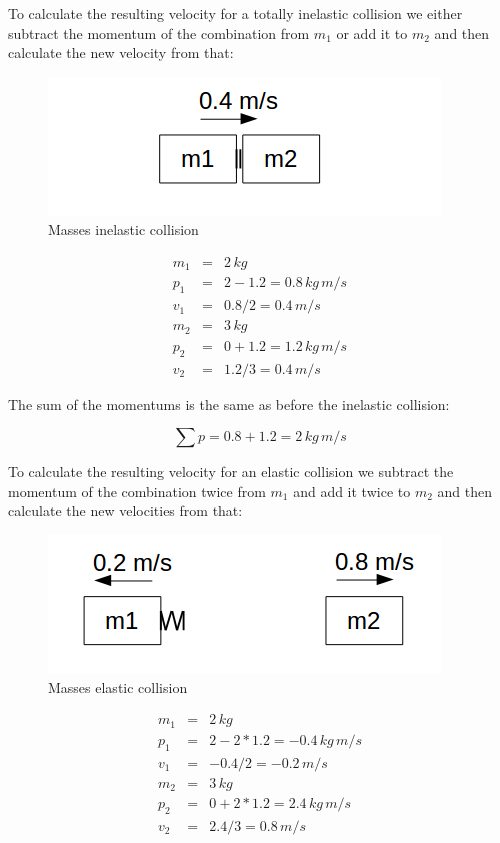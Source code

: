 \documentclass[]{../common/elementary-physics}
\begin{document}
To calculate the resulting velocity for a totally inelastic collision we either subtract the momentum of the combination from $m_1$ or add it to $m_2$ and then calculate the new velocity from that:

\begin{figure}[ht] \centering
	\includegraphics[scale=.5]{mms5} \caption{Masses inelastic collision}
\end{figure}

\begin{eqnarray}
m_1 &=& 2 \, kg \\
p_1 &=& 2 - 1.2 = 0.8 \, kg \, m/s \\
v_1 &=& 0.8 / 2 = 0.4 \, m/s \\
m_2 &=& 3 \, kg \\
p_2 &=& 0 + 1.2 = 1.2 \, kg \, m/s \\
v_2 &=& 1.2 / 3 = 0.4 \, m/s
\end{eqnarray}

The sum of the momentums is the same as before the inelastic collision:

\begin{equation}
\sum p = 0.8 + 1.2 = 2 \, kg \, m/s
\end{equation}

To calculate the resulting velocity for an elastic collision we subtract the momentum of the combination twice from $m_1$ and add it twice to $m_2$ and then calculate the new velocities from that:

\begin{figure}[ht] \centering
	\includegraphics[scale=.5]{mms6} \caption{Masses elastic collision}
\end{figure}

\begin{eqnarray}
m_1 &=& 2 \, kg \\
p_1 &=& 2 - 2*1.2 = -0.4 \, kg \, m/s \\
v_1 &=& -0.4 / 2 = -0.2 \, m/s \\
m_2 &=& 3 \, kg \\
p_2 &=& 0 + 2*1.2 = 2.4 \, kg \, m/s \\
v_2 &=& 2.4 / 3 = 0.8 \, m/s
\end{eqnarray}
\end{document}
